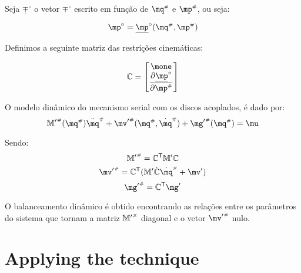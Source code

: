 \documentclass[a4paper,11pt,brazil,fleqn]{article}
\begin{document}
Seja $\underline{\mp}^\circ$ o vetor $\mp^\circ$ escrito em fun\c{c}\~{a}o de $\mq\ssh$ e $\mp\ssh$, ou seja:

\begin{equation}
\mp^\circ = \underline{\mp}^\circ(\mq\ssh, \mp\ssh) 
\end{equation}

Definimos a seguinte matriz das restri\c{c}\~{o}es cinem\'{a}ticas:

\begin{equation}
\mC =
\begin{bmatrix}
\mone \\
\displaystyle\frac{\partial \underline{\mp}^\circ}{\partial \mp\ssh}
\end{bmatrix}
\end{equation}

O modelo din\^{a}mico do mecanismo serial com os discos acoplados, \'{e} dado por:
\begin{equation}
{\mM'}\ssh (\mq\ssh) \ddot{\mq}\ssh + {\mv'}\ssh(\mq\ssh,\dot{\mq}\ssh) + {\mg'}\ssh (\mq\ssh) = \mu
\end{equation}

Sendo:
\begin{equation}
{\mathbb{M}'}^{\scriptscriptstyle \#} = \mathbb{C}^{\mathsf{T}} \mathbb{M}' \mathbb{C}
\end{equation}
\begin{equation}
{\mv'}\ssh = \mC^\msT ( \mM' \dot{\mC} \dot{\mq}\ssh + \mv')
\end{equation}
\begin{equation}
{\mg'}\ssh = \mC^\msT \mg'
\end{equation}

O balanceamento din\^{a}mico \'{e} obtido encontrando as rela\c{c}\~{o}es entre os par\^{a}metros do sistema que tornam a matriz ${\mathbb{M}'}^{\scriptscriptstyle \#}$ diagonal e o vetor ${\mv'}\ssh$ nulo.


 

\section{Applying the technique}\label{S03}
\end{document}

